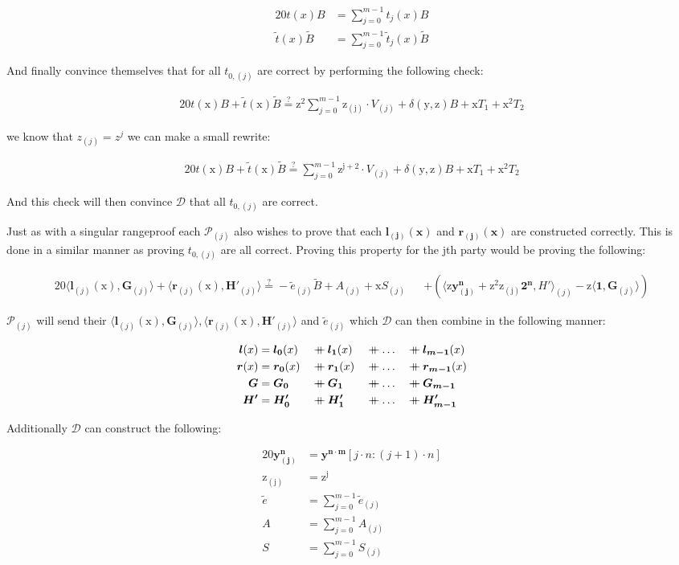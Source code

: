 \documentclass{article}
\newcommand{\eq}[1]{\begin{alignat*}{20}#1\end{alignat*}}
\renewcommand{\vec}[1]{\boldsymbol{#1}}
\newcommand{\ran}[1]{\mathrm{#1}}
\newcommand{\vecran}[1]{\mathbf{#1}}
\renewcommand{\P}{\mathcal{P}}
\newcommand{\D}{\mathcal{D}}
\newcommand\concat{\mathbin{+\mkern-10mu+}} %
\newcommand{\dotp}[2]{\langle #1, #2 \rangle}
\newcommand{\tB}{\widetilde{B}}
\renewcommand{\tt}{\widetilde{t}}
\begin{document}
\eq{
t(x)B &= \sum^{m-1}_{j = 0} t_{j}(x)B\\
\tt(x)\tB &= \sum^{m-1}_{j = 0} \tt_{j}(x)\tB
}

And finally convince themselves that for all $t_{0,(j)}$ are correct
by performing the following check:

\eq{
	t(\ran{x})B + \widetilde{t}(\ran{x})\widetilde{B} \stackrel{?}{=} \ran{z^2}\sum^{m-1}_{j = 0} \ran{z_{(j)}} \cdot V_{(j)} + \delta(\ran{y},\ran{z})B + \ran{x}T_1 + \ran{x^2}T_2
}

we know that $z_{(j)} = z^j$ we can make a small rewrite:

\eq{
	t(\ran{x})B + \widetilde{t}(\ran{x})\widetilde{B} \stackrel{?}{=} \sum^{m-1}_{j = 0} \ran{z^{j+2}} \cdot V_{(j)} + \delta(\ran{y},\ran{z})B + \ran{x}T_1 + \ran{x^2}T_2
}


And this check will then convince $\D$ that all $t_{0,(j)}$
are correct.

Just as with a singular rangeproof each $\P_{(j)}$ also wishes to prove
that each $\vec{l_{(j)}(x)}$ and $\vec{r_{(j)}(x)}$ are constructed
correctly. This is done in a similar manner as proving $t_{0,(j)}$
are all correct. Proving this property for the jth party would be
proving the following:

\eq{
	\dotp{\vec{l}_{(j)}(\ran{x})}{\vec{G}_{(j)}} + \dotp{\vec{r}_{(j)}(\ran{x})}{\vec{H'}_{(j)}} \stackrel{?}{=} -\widetilde{e}_{(j)}\widetilde{B} + A_{(j)} + \ran{x}S_{(j)} &&+ (\dotp{\ran{z}\vecran{y^n_{(j)}} + \ran{z^2}\ran{z_{(j)}}\vec{2^n}}{H'}_{(j)} - \ran{z}\dotp{\vec{1}}{\vec{G}_{(j)}})
}

$\P_{(j)}$ will send their $\dotp{\vec{l}_{(j)}(\ran{x})}{\vec{G}_{(j)}},
\dotp{\vec{r}_{(j)}(\ran{x})}{\vec{H'}_{(j)}}$ and $\widetilde{e}_{(j)}$
which $\D$ can then combine in the following manner:

\eq{
	\vec{l}(x) &= \vec{l_0}(x) &&\concat \vec{l_1}(x) &&\concat \dots &&\concat \vec{l_{m-1}}(x)\\
	\vec{r}(x) &= \vec{r_0}(x) &&\concat \vec{r_1}(x) &&\concat \dots &&\concat \vec{r_{m-1}}(x)\\
	\vec{G} &= \vec{G_0} &&\concat \vec{G_1} &&\concat \dots &&\concat \vec{G_{m-1}}\\
	\vec{H'} &= \vec{H'_0} &&\concat \vec{H'_1} &&\concat \dots &&\concat \vec{H'_{m-1}}
}

Additionally $\D$ can construct the following:

\eq{
	\vecran{y^n_{(j)}} &= \vecran{y^{n \cdot m}}[j \cdot n : (j+1) \cdot n]\\
	\ran{z_{(j)}}      &= \ran{z^j}\\
	\widetilde{e}      &= \sum^{m-1}_{j = 0} \widetilde{e}_{(j)}\\
	A                  &= \sum^{m-1}_{j = 0} A_{(j)}\\
	S                  &= \sum^{m-1}_{j = 0} S_{(j)}
}
\end{document}
